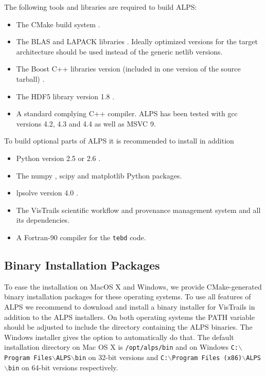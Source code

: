 \documentclass[12pt]{iopart}
\begin{document}
The following tools and libraries are required to build ALPS:

\begin{itemize}
\item The CMake build system \cite{cmake}.
\item The BLAS \cite{blasnetlib} and LAPACK libraries \cite{lapack}. Ideally optimized versions for the target architecture should be used instead of the generic netlib versions.
\item The Boost C++ libraries version (included in one version of the source tarball) \cite{boost}.
\item The HDF5 library version 1.8 \cite{hdf5}.
\item A standard complying C++ compiler. ALPS has been tested with gcc versions 4.2, 4.3 and 4.4 as well as MSVC 9.
\end{itemize}
To build optional parts of ALPS it is recommended to install in addition
\begin{itemize}
\item Python version 2.5 or 2.6 \cite{python}.
\item The numpy \cite{numpy}, scipy \cite{scipy} and matplotlib \cite{matplotlib} Python packages.
\item lpsolve version 4.0 \cite{lpsolve}.
\item The VisTrails scientific workflow and provenance management system \cite{vistrails} and all its dependencies.
\item A Fortran-90 compiler for the {\tt tebd} code.
\end{itemize}

\subsection{Binary Installation Packages}

To ease the installation on MacOS X and Windows, we provide CMake-generated binary installation packages for these operating systems. To use all features of ALPS we recommend to download and install a binary installer for VisTrails \cite{vistrails} in addition to the ALPS installers. On both operating systems the PATH variable should be adjusted to include the directory containing the ALPS binaries. The Windows installer gives the option to automatically do that. The default installation directory on Mac OS X is {\tt /opt/alps/bin} and on Windows {\tt C:$\backslash$Program Files$\backslash$ALPS$\backslash$bin} on 32-bit versions and  {\tt C:$\backslash$Program Files (x86)$\backslash$ALPS$\backslash$bin} on 64-bit versions respectively.
\end{document}
